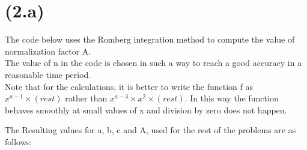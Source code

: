\section{(2.a)}
The code below uses the Romberg integration method to compute the value of normalization factor A. \\
The value of n in the code is chosen in such a way to reach a good accuracy in a reasonable time period.\\
Note that for the calculations, it is better to write the function f as $x^{a-1}\times (rest)$ rather than $x^{a-3}\times x^2 \times (rest)$. In this way the function behaves smoothly at small values of x and division by zero does not happen.



The Resulting values for a, b, c and A, used for the rest of the problems are as follows:


